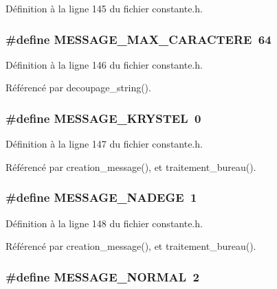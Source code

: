 D\'{e}finition \`{a} la ligne 145 du fichier constante.h.
\subsubsection{\setlength{\rightskip}{0pt plus 5cm}\#define MESSAGE\_\-MAX\_\-CARACTERE~64}\label{constante_8h_d31aae55a87f454cd6e752af9706d481}




D\'{e}finition \`{a} la ligne 146 du fichier constante.h.

R\'{e}f\'{e}renc\'{e} par decoupage\_\-string().
\subsubsection{\setlength{\rightskip}{0pt plus 5cm}\#define MESSAGE\_\-KRYSTEL~0}\label{constante_8h_d23b08a64916575728c7d84e8548d070}




D\'{e}finition \`{a} la ligne 147 du fichier constante.h.

R\'{e}f\'{e}renc\'{e} par creation\_\-message(), et traitement\_\-bureau().
\subsubsection{\setlength{\rightskip}{0pt plus 5cm}\#define MESSAGE\_\-NADEGE~1}\label{constante_8h_0e055cedb0d436c3589e18d019be1779}




D\'{e}finition \`{a} la ligne 148 du fichier constante.h.

R\'{e}f\'{e}renc\'{e} par creation\_\-message(), et traitement\_\-bureau().
\subsubsection{\setlength{\rightskip}{0pt plus 5cm}\#define MESSAGE\_\-NORMAL~2}\label{constante_8h_053cae792dc14f665c1787b2f12b2759}




